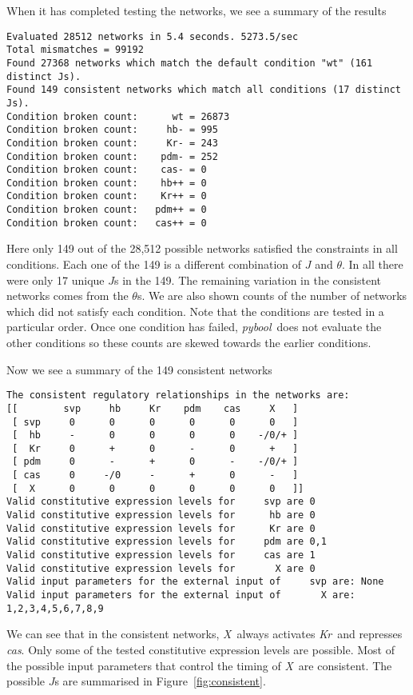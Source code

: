 \documentclass{article}
\newcommand{\pybool}{\emph{pybool}}
\newcommand{\Kr}{\emph{Kr}}
\newcommand{\cas}{\emph{cas}}
\newcommand{\X}{\emph{X}}
\begin{document}
When it has completed testing the networks, we see a summary of the results
\begin{lstlisting}[style=output]
Evaluated 28512 networks in 5.4 seconds. 5273.5/sec
Total mismatches = 99192
Found 27368 networks which match the default condition "wt" (161 distinct Js).
Found 149 consistent networks which match all conditions (17 distinct Js).
Condition broken count:      wt = 26873
Condition broken count:     hb- = 995
Condition broken count:     Kr- = 243
Condition broken count:    pdm- = 252
Condition broken count:    cas- = 0
Condition broken count:    hb++ = 0
Condition broken count:    Kr++ = 0
Condition broken count:   pdm++ = 0
Condition broken count:   cas++ = 0
\end{lstlisting}
Here only 149 out of the 28,512 possible networks satisfied the constraints in all conditions. Each one of the 149 is a different combination of $J$ and $\theta$. In all there were only 17 unique $J$s in the 149. The remaining variation in the consistent networks comes from the $\theta$s. We are also shown counts of the number of networks which did not satisfy each condition. Note that the conditions are tested in a particular order. Once one condition has failed, \pybool\ does not evaluate the other conditions so these counts are skewed towards the earlier conditions.

Now we see a summary of the 149 consistent networks
\begin{lstlisting}[style=output]
The consistent regulatory relationships in the networks are:
[[        svp     hb     Kr    pdm    cas     X   ]
 [ svp     0      0      0      0      0      0   ]
 [  hb     -      0      0      0      0    -/0/+ ]
 [  Kr     0      +      0      -      0      +   ]
 [ pdm     0      -      +      0      -    -/0/+ ]
 [ cas     0     -/0     -      +      0      -   ]
 [  X      0      0      0      0      0      0   ]]
Valid constitutive expression levels for     svp are 0
Valid constitutive expression levels for      hb are 0
Valid constitutive expression levels for      Kr are 0
Valid constitutive expression levels for     pdm are 0,1
Valid constitutive expression levels for     cas are 1
Valid constitutive expression levels for       X are 0
Valid input parameters for the external input of     svp are: None
Valid input parameters for the external input of       X are: 1,2,3,4,5,6,7,8,9
\end{lstlisting}
We can see that in the consistent networks, \X\ always activates \Kr\ and represses \cas. Only some of the tested constitutive expression levels are possible. Most of the possible input parameters that control the timing of \X\ are consistent. The possible $J$s are summarised in Figure~\ref{fig:consistent}.
\end{document}

